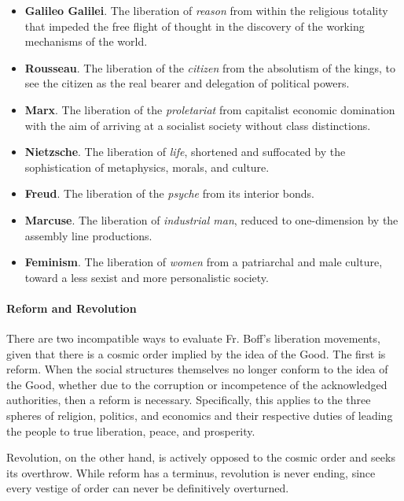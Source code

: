 \begin{itemize}


\item \textbf{Galileo Galilei}. The liberation of \emph{reason} from within the religious totality that impeded the free flight of thought in the discovery of the working mechanisms of the world.

\item \textbf{Rousseau}. The liberation of the \emph{citizen} from the absolutism of the kings, to see the citizen as the real bearer and delegation of political powers.

\item \textbf{Marx}. The liberation of the \emph{proletariat} from capitalist economic domination with the aim of arriving at a socialist society without class distinctions.

\item \textbf{Nietzsche}. The liberation of \emph{life}, shortened and suffocated by the sophistication of metaphysics, morals, and culture.

\item \textbf{Freud}. The liberation of the \emph{psyche} from its interior bonds.

\item \textbf{Marcuse}. The liberation of \emph{industrial man}, reduced to one-dimension by the assembly line productions.

\item \textbf{Feminism}. The liberation of \emph{women} from a patriarchal and male culture, toward a less sexist and more personalistic society.
\end{itemize}


\paragraph{Reform and Revolution}


There are two incompatible ways to evaluate Fr. Boff's liberation movements, given that there is a cosmic order implied by the idea of the Good. The first is reform. When the social structures themselves no longer conform to the idea of the Good, whether due to the corruption or incompetence of the acknowledged authorities, then a reform is necessary. Specifically, this applies to the three spheres of religion, politics, and economics and their respective duties of leading the people to true liberation, peace, and prosperity.

Revolution, on the other hand, is actively opposed to the cosmic order and seeks its overthrow. While reform has a terminus, revolution is never ending, since every vestige of order can never be definitively overturned.


